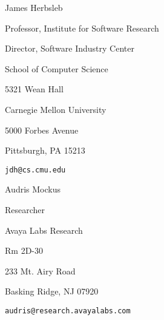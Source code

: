 \documentclass[margin,line,article,letterpaper]{res}
\newenvironment{list1}{
  \begin{list}{}{%
      \setlength{\itemsep}{0in}
      \setlength{\parsep}{0in} \setlength{\parskip}{0in}
      \setlength{\topsep}{0in} \setlength{\partopsep}{0in} 
      \setlength{\leftmargin}{0.17in}}}{\end{list}}
\begin{document}
\begin{resume}
James Herbsleb
\begin{list1}
\item Professor, Institute for Software Research
\item Director, Software Industry Center
\item School of Computer Science
\item 5321 Wean Hall
\item Carnegie Mellon University
\item 5000 Forbes Avenue
\item Pittsburgh, PA 15213
\item \texttt{jdh@cs.cmu.edu}
\end{list1}

Audris Mockus
\begin{list1}
\item Researcher
\item Avaya Labs Research
\item Rm 2D-30
\item 233 Mt. Airy Road
\item Basking Ridge, NJ 07920
\item \texttt{audris@research.avayalabs.com}
\end{list1}

\end{resume}
\end{document}
